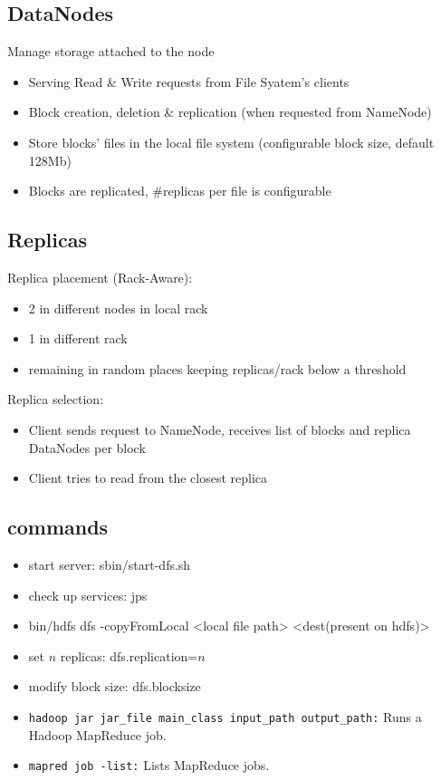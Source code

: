 \subsection{DataNodes}
Manage storage attached to the node

\begin{itemize}
  \item Serving Read \& Write requests from File Syatem's clients
  \item Block creation, deletion \& replication (when requested from NameNode)
  \item Store blocks' files in the local file system (configurable block size, default 128Mb)
  \item Blocks are replicated, \#replicas per file is configurable
  \end{itemize}

\subsection{Replicas}
Replica placement (Rack-Aware):
\begin{itemize}
    \item 2 in different nodes in local rack
    \item 1 in different rack
    \item remaining in random places keeping replicas/rack below a threshold
\end{itemize}
Replica selection:
\begin{itemize}
    \item Client sends request to NameNode, receives list of blocks and replica DataNodes per block
    \item Client tries to read from the closest replica
\end{itemize}
\subsection{commands}
\begin{itemize}
\item start server: sbin/start-dfs.sh
    \item check up services: jps
     \item bin/hdfs dfs -copyFromLocal <local file path>  <dest(present on hdfs)>
    \item set $n$ replicas: dfs.replication=$n$
    \item modify block size: dfs.blocksize
  \item \texttt{hadoop jar jar\_file main\_class input\_path output\_path:} Runs a Hadoop MapReduce job.
  \item \texttt{mapred job -list:} Lists MapReduce jobs.
\end{itemize}

